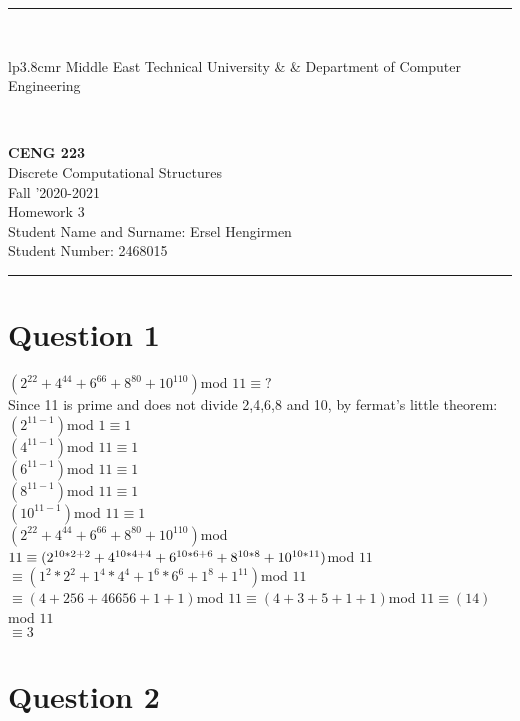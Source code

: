 \documentclass[12pt]{article}
\newcommand{\HRule}{\rule{\linewidth}{1mm}}
\begin{document}
\noindent
\HRule \\[3mm]
\small
\begin{tabular}[b]{lp{3.8cm}r}
{} Middle East Technical University &  &
{} Department of Computer Engineering \\
\end{tabular} \\
\begin{center}

                 \LARGE \textbf{CENG 223} \\[4mm]
                 \Large Discrete Computational Structures \\[4mm]
                \normalsize Fall '2020-2021 \\
                    \Large Homework 3 \\
                \normalsize Student Name and Surname: Ersel Hengirmen  \\
                \normalsize Student Number: 2468015\\
\end{center}
\HRule


\section*{Question 1}
$(2^{22} + 4^{44} + 6^{66} + 8^{80} + 10^{110}) $mod $11 \equiv ?$\\
Since 11 is prime and does not divide 2,4,6,8 and 10, by fermat's little theorem:\\
$(2^{11-1})$mod $1\equiv 1$\\
$(4^{11-1})$mod $11\equiv 1$\\
$(6^{11-1})$mod $11\equiv 1$\\
$(8^{11-1})$mod $11\equiv 1$\\
$(10^{11-1})$mod $11\equiv 1$\\

$(2^{22} + 4^{44} + 6^{66} + 8^{80} + 10^{110}) $mod $11 \\
\equiv (2^{10*2+2} + 4^{10*4+4} + 6^{10*6+6} + 8^{10*8} + 10^{10*11}) $mod $11 $\\
$\equiv (1^{2}*2^{2}+1^{4}*4^{4}+1^{6}*6^{6}+1^{8}+1^{11})$mod $11$\\
$\equiv (4+256+46656+1+1)$mod $11\equiv (4+3+5+1+1)$mod $11\equiv (14)$mod $11$\\
$\equiv 3$\\

\section*{Question 2}
\end{document}

